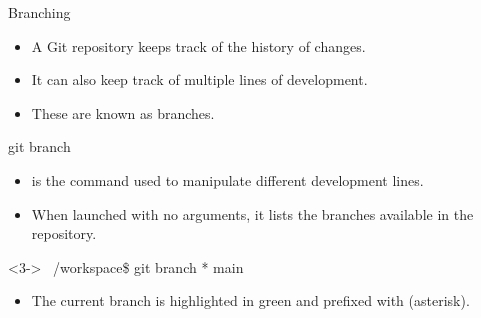 \begin{frame}[fragile]{Branching}
\begin{itemize}[<+->]
	  \item A Git repository keeps track of the history of changes.
    \item It can also keep track of multiple lines of development.
    \item These are known as \alert{branches}.
\end{itemize}
\end{frame}

\begin{frame}[fragile]{git branch}
    \begin{itemize}[<+->]
        \item {} is the command used to manipulate different development lines.
        \item When launched with no arguments, it lists the branches available in the repository.
    \end{itemize}
    \begin{shellblock}<3->
~/workspace\$ git branch\inserthitenter
{\color{white}*} main
\end{shellblock}
    \begin{itemize}[<4->]
        \item The current branch is highlighted in green and prefixed with \code{*} (asterisk).
    \end{itemize}
\end{frame}

